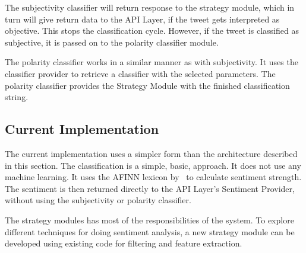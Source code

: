 The subjectivity classifier will return response to the strategy module, which in turn will give return data to the API Layer, if the tweet gets interpreted as objective. This stops the classification cycle. However, if the tweet is classified as subjective, it is passed on to the polarity classifier module. 

The polarity classifier works in a similar manner as with subjectivity. It uses the classifier provider to retrieve a classifier with the selected parameters. The polarity classifier provides the Strategy Module with the finished classification string.


\subsection{Current Implementation}

The current implementation uses a simpler form than the architecture described in this section. The classification is a simple, basic, approach. It does not use any machine learning. It uses the AFINN lexicon by~\cite{article:afinn} to calculate sentiment strength. The sentiment is then returned directly to the API Layer's Sentiment Provider, without using the subjectivity or polarity classifier.

The strategy modules has most of the responsibilities of the system. To explore different techniques for doing sentiment analysis, a new strategy module can be developed using existing code for filtering and feature extraction. 

